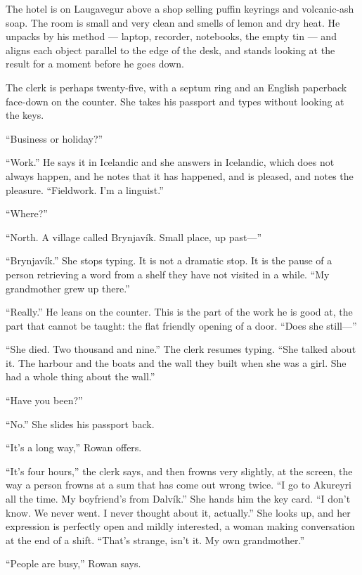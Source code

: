 \documentclass[11pt,oneside]{book}
\newcommand{\sceneline}{%
  \par\vspace{1.2em}
  \begin{center}
    \fontsize{11}{11}\selectfont \textbullet\quad\textbullet\quad\textbullet
  \end{center}
  \vspace{0.6em}\noindent\ignorespaces
}
\begin{document}
\sceneline

The hotel is on Laugavegur above a shop selling puffin keyrings and
volcanic-ash soap. The room is small and very clean and smells of
lemon and dry heat. He unpacks by his method --- laptop, recorder,
notebooks, the empty tin --- and aligns each object parallel to the
edge of the desk, and stands looking at the result for a moment before
he goes down.

The clerk is perhaps twenty-five, with a septum ring and an English
paperback face-down on the counter. She takes his passport and types
without looking at the keys.

``Business or holiday?''

``Work.'' He says it in Icelandic and she answers in Icelandic, which
does not always happen, and he notes that it has happened, and is
pleased, and notes the pleasure. ``Fieldwork. I'm a linguist.''

``Where?''

``North. A village called Brynjavík. Small place, up past---''

``Brynjavík.'' She stops typing. It is not a dramatic stop. It is the
pause of a person retrieving a word from a shelf they have not visited
in a while. ``My grandmother grew up there.''

``Really.'' He leans on the counter. This is the part of the work he is
good at, the part that cannot be taught: the flat friendly opening of a
door. ``Does she still---''

``She died. Two thousand and nine.'' The clerk resumes typing. ``She
talked about it. The harbour and the boats and the wall they built when
she was a girl. She had a whole thing about the wall.''

``Have you been?''

``No.'' She slides his passport back.

``It's a long way,'' Rowan offers.

``It's four hours,'' the clerk says, and then frowns very slightly, at
the screen, the way a person frowns at a sum that has come out wrong
twice. ``I go to Akureyri all the time. My boyfriend's from Dalvík.''
She hands him the key card. ``I don't know. We never went. I never
thought about it, actually.'' She looks up, and her expression is
perfectly open and mildly interested, a woman making conversation at the
end of a shift. ``That's strange, isn't it. My own grandmother.''

``People are busy,'' Rowan says.
\end{document}
